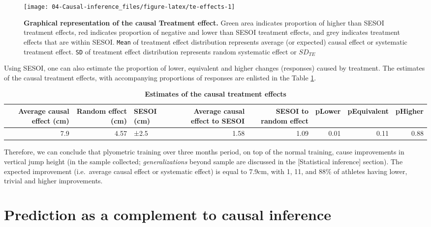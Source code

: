 \documentclass[
]{book}
\begin{document}
\begin{figure}

{\centering \texttt{[image: 04-Causal-inference\_files/figure-latex/te-effects-1]} 

}

\caption{\textbf{Graphical representation of the causal Treatment effect.} Green area indicates proportion of higher than SESOI treatment effects, red indicates proportion of negative and lower than SESOI treatment effects, and grey indicates treatment effects that are within SESOI. \texttt{Mean} of treatment effect distribution represents average (or expected) causal effect or systematic treatment effect. \texttt{SD} of treatment effect distribution represents random systematic effect or \(SD_{TE}\)}\label{fig:te-effects}
\end{figure}



Using SESOI, one can also estimate the proportion of lower, equivalent and higher changes (responses) caused by treatment. The estimates of the causal treatment effects, with accompanying proportions of responses are enlisted in the Table \ref{tab:te-effects-estimates}.



\begin{table}

\caption{\label{tab:te-effects-estimates}\textbf{Estimates of the causal treatment effects}}
\centering
\begin{tabular}[t]{rrlrrrrr}
\toprule
Average causal effect (cm) & Random effect (cm) & SESOI (cm) & Average causal effect to SESOI & SESOI to random effect & pLower & pEquivalent & pHigher\\
\midrule
7.9 & 4.57 & ±2.5 & 1.58 & 1.09 & 0.01 & 0.11 & 0.88\\
\bottomrule
\end{tabular}
\end{table}

Therefore, we can conclude that plyometric training over three months period, on top of the normal training, cause improvements in vertical jump height (in the sample collected; \emph{generalizations} beyond sample are discussed in the {[}Statistical inference{]} section). The expected improvement (i.e.~average causal effect or systematic effect) is equal to 7.9cm, with 1, 11, and 88\% of athletes having lower, trivial and higher improvements.

\hypertarget{prediction-as-a-complement-to-causal-inference}{%
\section{Prediction as a complement to causal inference}\label{prediction-as-a-complement-to-causal-inference}}
\end{document}
